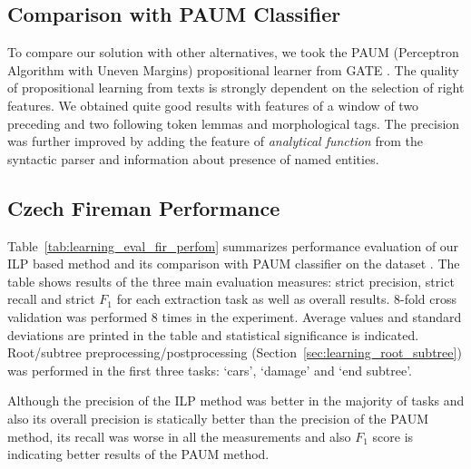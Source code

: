 \subsection{Comparison with PAUM Classifier}
To compare our solution with other alternatives, we took the PAUM (Perceptron Algorithm with Uneven Margins) propositional learner from GATE \citep{Li:Paum}. The quality of propositional learning from texts is strongly dependent on the selection of right features. We obtained quite good results with features of a window of two preceding and two following token lemmas and morphological tags. The precision was further improved by adding the feature of \emph{analytical function} from the syntactic parser and information about presence of named entities.




\subsection{Czech Fireman Performance}

Table~\ref{tab:learning_eval_fir_perfom} summarizes performance evaluation of our ILP based method and its comparison with PAUM classifier on the dataset . The table shows results of the three main evaluation measures: strict precision, strict recall and strict $F_1$ for each extraction task as well as overall results. 8-fold cross validation was performed 8 times in the experiment. Average values and standard deviations are printed in the table and statistical significance is indicated. Root/subtree preprocessing/postprocessing (Section~\ref{sec:learning_root_subtree}) was performed in the first three tasks: `cars’, `damage’ and `end subtree’.

Although the precision of the ILP method was better in the majority of tasks and also its overall precision is statically better than the precision of the PAUM method, its recall was worse in all the measurements and also $F_1$ score is indicating better results of the PAUM method. 


